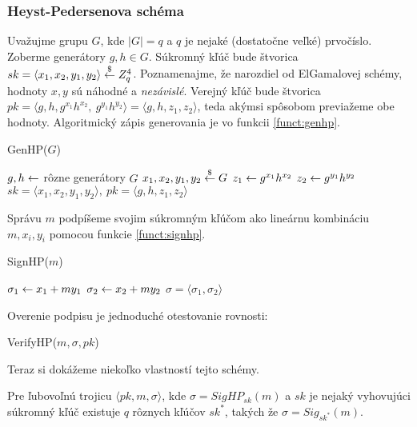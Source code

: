 \subsubsection{Heyst-Pedersenova schéma}

Uvažujme grupu $G$, kde $|G| = q$ a $q$ je nejaké (dostatočne veľké) prvočíslo.
Zoberme generátory $g, h \in G$.
Súkromný kľúč bude štvorica  
$sk = \langle x_1, x_2, y_1, y_2 \rangle \overset{\$}{\leftarrow} Z_q^4$.
Poznamenajme, že narozdiel od ElGamalovej schémy, hodnoty $x,y$ sú
náhodné a \emph{nezávislé}.
Verejný kľúč bude štvorica 
$pk = \langle g,h, g^{x_1} h^{x_2},\ g^{y_1} h^{y_2} \rangle = 
    \langle g,h,z_1, z_2 \rangle$, teda akýmsi
spôsobom previažeme obe hodnoty. Algoritmický zápis generovania je vo
funkcii \ref{funct:genhp}.

\begin{function}[h!]
    \caption{GenHP($G$)}
    \label{funct:genhp}
    $g,h \leftarrow $ rôzne generátory $G$\;
    $x_1,x_2,y_1,y_2 \overset{\$}{\leftarrow} G$\;
    $z_1 \leftarrow g^{x_1} h^{x_2}$\;
    $z_2 \leftarrow g^{y_1} h^{y_2}$\;
    \Return $sk=\langle x_1,x_2,y_1,y_2 \rangle,\ 
        pk=\langle g,h,z_1,z_2 \rangle$\;
\end{function}

Správu $m$ podpíšeme svojim súkromným kľúčom ako lineárnu kombináciu
$m,x_i, y_i$ pomocou funkcie \ref{funct:signhp}.

\begin{function}[h!]
    \caption{SignHP($m$)}
    \label{funct:signhp}
    $\sigma_1 \leftarrow x_1 + m y_1$\;
    $\sigma_2 \leftarrow x_2 + m y_2$\;
    \Return $\sigma=\langle \sigma_1,\sigma_2 \rangle$\;
\end{function}

Overenie podpisu je jednoduché otestovanie
rovnosti:
\begin{function}[h!]
    \caption{VerifyHP($m,\sigma,pk$)}
\end{function}

Teraz si dokážeme niekoľko vlastností tejto schémy.

\begin{lema}
    Pre ľubovoľnú trojicu $\langle pk, m, \sigma \rangle$,
    kde $\sigma = SigHP_{sk}(m)$
    a $sk$ je nejaký vyhovujúci súkromný kľúč
    existuje $q$ rôznych kľúčov $sk^*$, takých že $\sigma = Sig_{sk^*}(m)$.
\end{lema}

